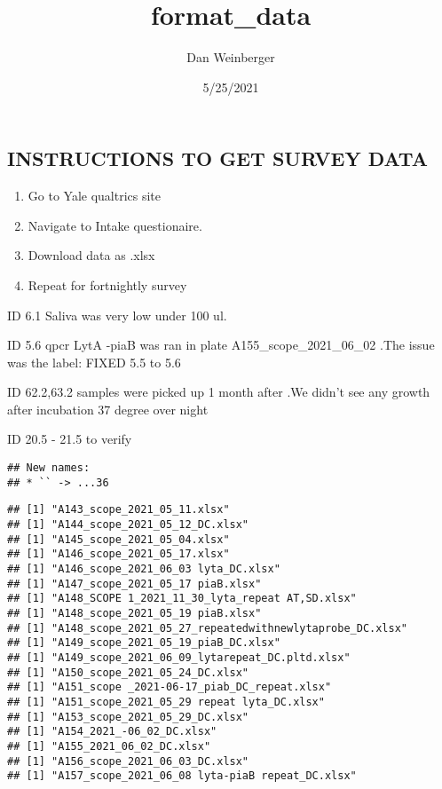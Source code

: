 \documentclass[
]{article}
\title{format\_data}
\author{Dan Weinberger}
\date{5/25/2021}
\providecommand{\tightlist}{%
  \setlength{\itemsep}{0pt}\setlength{\parskip}{0pt}}
\begin{document}
\maketitle

\hypertarget{instructions-to-get-survey-data}{%
\subsection{INSTRUCTIONS TO GET SURVEY
DATA}\label{instructions-to-get-survey-data}}

\begin{enumerate}
\def\labelenumi{\arabic{enumi}.}
\tightlist
\item
  Go to Yale qualtrics site
\item
  Navigate to Intake questionaire.
\item
  Download data as .xlsx
\item
  Repeat for fortnightly survey
\end{enumerate}

ID 6.1 Saliva was very low under 100 ul.

ID 5.6 qpcr LytA -piaB was ran in plate A155\_scope\_2021\_06\_02 .The
issue was the label: FIXED 5.5 to 5.6

ID 62.2,63.2 samples were picked up 1 month after .We didn't see any
growth after incubation 37 degree over night

ID 20.5 - 21.5 to verify

\begin{verbatim}
## New names:
## * `` -> ...36
\end{verbatim}

\begin{verbatim}
## [1] "A143_scope_2021_05_11.xlsx"
## [1] "A144_scope_2021_05_12_DC.xlsx"
## [1] "A145_scope_2021_05_04.xlsx"
## [1] "A146_scope_2021_05_17.xlsx"
## [1] "A146_scope_2021_06_03 lyta_DC.xlsx"
## [1] "A147_scope_2021_05_17 piaB.xlsx"
## [1] "A148_SCOPE 1_2021_11_30_lyta_repeat AT,SD.xlsx"
## [1] "A148_scope_2021_05_19 piaB.xlsx"
## [1] "A148_scope_2021_05_27_repeatedwithnewlytaprobe_DC.xlsx"
## [1] "A149_scope_2021_05_19_piaB_DC.xlsx"
## [1] "A149_scope_2021_06_09_lytarepeat_DC.pltd.xlsx"
## [1] "A150_scope_2021_05_24_DC.xlsx"
## [1] "A151_scope _2021-06-17_piab_DC_repeat.xlsx"
## [1] "A151_scope_2021_05_29 repeat lyta_DC.xlsx"
## [1] "A153_scope_2021_05_29_DC.xlsx"
## [1] "A154_2021_-06_02_DC.xlsx"
## [1] "A155_2021_06_02_DC.xlsx"
## [1] "A156_scope_2021_06_03_DC.xlsx"
## [1] "A157_scope_2021_06_08 lyta-piaB repeat_DC.xlsx"
\end{verbatim}
\end{document}
